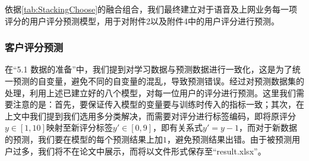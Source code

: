 \documentclass{MathorCupmodeling}
\begin{document}
	\begin{table}[H]
	\centering
	\caption{各个评分预测Stacking集成学习模型的建立}
	\setlength{\aboverulesep}{0pt}
	\setlength{\belowrulesep}{0pt}
	\label{tab:StackingChoose}
 	\end{table}
	
	依据\textcolor{blue}{\cref{tab:StackingChoose}}的融合组合，我们最终建立对于语音及上网业务每一项评分的用户评分预测模型，用于对附件2以及附件4中的用户评分进行预测。
	\subsubsection{客户评分预测}
	在“5.1 数据的准备”中，我们提到对学习数据与预测数据进行一致化，这是为了统一预测的自变量，避免不同的自变量的混乱，导致预测错误。经过对预测数据集的处理，利用上述已建立好的八个模型，对每一位用户的评分进行预测。这里我们需要注意的是：首先，要保证传入模型的变量要与训练时传入的指标一致；其次，在上文中我们提到我们选用多分类解决，而需要对评分进行标签编码，即将原评分$y\in\left[1,10\right]$映射至新评分标签$y'\in\left[0,9\right]$，即有关系式$y'=y-1$，而对于新数据的预测，我们要在模型的每个预测结果上加$1$，避免预测结果出错。由于被预测用户过多，我们将不在论文中展示，而将以文件形式保存至“result.xlsx”。
\end{document}

